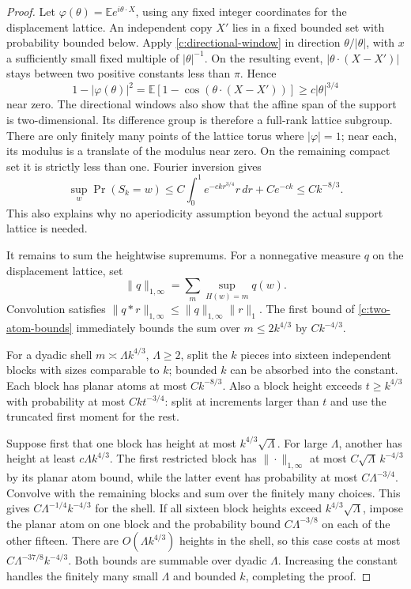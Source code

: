 \begin{proof}
Let $\varphi(\theta)=\mathbb E e^{i\theta\cdot X}$, using any fixed
integer coordinates for the displacement lattice.  An independent copy
$X'$ lies in a fixed bounded set with probability bounded below.  Apply
\eqref{c:directional-window} in direction $\theta/|\theta|$, with
$x$ a sufficiently small fixed multiple of $|\theta|^{-1}$.  On the
resulting event, $|\theta\cdot(X-X')|$ stays between two positive
constants less than $\pi$.  Hence
\[
 1-|\varphi(\theta)|^2
 =\mathbb E[1-\cos(\theta\cdot(X-X'))]
 \ge c|\theta|^{3/4}
\]
near zero.  The directional windows also show that the affine span of the
support is two-dimensional.  Its difference group is therefore a
full-rank lattice subgroup.  There are only finitely many points of the
lattice torus where $|\varphi|=1$; near each, its modulus is a translate
of the modulus near zero.  On the remaining compact set it is strictly
less than one.  Fourier inversion gives
\[
 \sup_w\Pr(S_k=w)
 \le C\int_0^1 e^{-ckr^{3/4}}r\,dr+Ce^{-ck}
 \le Ck^{-8/3}.
\]
This also explains why no aperiodicity assumption beyond the actual
support lattice is needed.

It remains to sum the heightwise supremums.  For a nonnegative measure
$q$ on the displacement lattice, set
\[
 \|q\|_{1,\infty}
 =\sum_m\sup_{H(w)=m}q(w).
\]
Convolution satisfies
$\|q*r\|_{1,\infty}\le\|q\|_{1,\infty}\|r\|_1$.
The first bound of \eqref{c:two-atom-bounds} immediately bounds the sum
over $m\le2k^{4/3}$ by $Ck^{-4/3}$.

For a dyadic shell $m\asymp\Lambda k^{4/3}$, $\Lambda\ge2$, split the $k$ pieces
into sixteen independent blocks with sizes comparable to $k$; bounded
$k$ can be absorbed into the constant.  Each block has planar atoms at
most $Ck^{-8/3}$.  Also a block height exceeds $t\ge k^{4/3}$ with
probability at most $Ckt^{-3/4}$: split at increments larger than $t$
and use the truncated first moment for the rest.

Suppose first that one block has height at most $k^{4/3}\sqrt\Lambda$.
For large $\Lambda$, another has height at least $c\Lambda k^{4/3}$.  The first
restricted block has $\|\cdot\|_{1,\infty}$ at most
$C\sqrt\Lambda\,k^{-4/3}$ by its planar atom bound, while the latter event
has probability at most $C\Lambda^{-3/4}$.  Convolve with the remaining blocks
and sum over the finitely many choices.  This gives
$C\Lambda^{-1/4}k^{-4/3}$ for the shell.  If all sixteen block heights exceed
$k^{4/3}\sqrt\Lambda$, impose the planar atom on one block and the probability
bound $C\Lambda^{-3/8}$ on each of the other fifteen.  There are
$O(\Lambda k^{4/3})$ heights in the shell, so this case costs at most
$C\Lambda^{-37/8}k^{-4/3}$.  Both bounds are summable over dyadic $\Lambda$.
Increasing the constant handles the finitely many small $\Lambda$ and bounded
$k$, completing the proof.
\end{proof}

